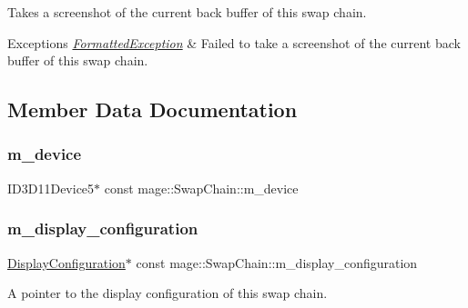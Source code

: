 Takes a screenshot of the current back buffer of this swap chain.


\begin{DoxyExceptions}{Exceptions}
{\em \hyperlink{classmage_1_1_formatted_exception}{Formatted\+Exception}} & Failed to take a screenshot of the current back buffer of this swap chain. \\
\hline
\end{DoxyExceptions}


\subsection{Member Data Documentation}
\hypertarget{classmage_1_1_swap_chain_a169f9613c42c3cad0ea83e9535676cd0}{}\label{classmage_1_1_swap_chain_a169f9613c42c3cad0ea83e9535676cd0} 
\subsubsection{\texorpdfstring{m\+\_\+device}{m\_device}}
{\footnotesize\ttfamily I\+D3\+D11\+Device5$\ast$ const mage\+::\+Swap\+Chain\+::m\+\_\+device\hspace{0.3cm}{\ttfamily [private]}}

\hypertarget{classmage_1_1_swap_chain_ac1aa833943aa6bfe464da32316f7096f}{}\label{classmage_1_1_swap_chain_ac1aa833943aa6bfe464da32316f7096f} 
\subsubsection{\texorpdfstring{m\+\_\+display\+\_\+configuration}{m\_display\_configuration}}
{\footnotesize\ttfamily \hyperlink{structmage_1_1_display_configuration}{Display\+Configuration}$\ast$ const mage\+::\+Swap\+Chain\+::m\+\_\+display\+\_\+configuration\hspace{0.3cm}{\ttfamily [private]}}

A pointer to the display configuration of this swap chain. \hypertarget{classmage_1_1_swap_chain_aea5964cd3bd2bfef89ae428cceef82fd}{}\label{classmage_1_1_swap_chain_aea5964cd3bd2bfef89ae428cceef82fd} 
